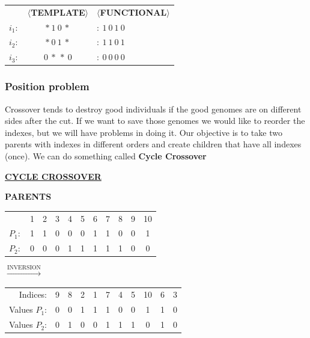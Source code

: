 \vspace{1em}

\begin{center}
    \begin{tabular}{r c l}
        & \textbf{$\langle$TEMPLATE$\rangle$} & \textbf{$\langle$FUNCTIONAL$\rangle$} \\
        $i_1:$ & $* \ 1 \ 0 \ *$ & $: \ 1 \ 0 \ 1 \ 0$ \\
        $i_2:$ & $* \ 0 \ 1 \ *$ & $: \ 1 \ 1 \ 0 \ 1$ \\
        $i_3:$ & $0 \ * \ * \ 0$ & $: \ 0 \ 0 \ 0 \ 0$ \\
    \end{tabular}
\end{center}

\subsubsection{Position problem}

Crossover tends to destroy good individuals if the good genomes are on different sides after the cut. If we want to save those genomes we would like to reorder the indexes, but we will have problems in doing it. Our objective is to take two parents with indexes in different orders and create children that have all indexes (once). We can do something called \textbf{Cycle Crossover}

\begin{center}
    \underline{\Large \textbf{CYCLE CROSSOVER}}
\end{center}

\vspace{1em}

\textbf{PARENTS} \\
\begin{tabular}{r cccccccccc}
    & 1 & 2 & 3 & 4 & 5 & 6 & 7 & 8 & 9 & 10 \\
    $P_1:$ & 1 & 1 & 0 & 0 & 0 & 1 & 1 & 0 & 0 & 1 \\
    $P_2:$ & 0 & 0 & 0 & 1 & 1 & 1 & 1 & 1 & 0 & 0 \\
\end{tabular}

\vspace{1em}
$\xrightarrow{\text{INVERSION}}$
\vspace{1em}

\begin{tabular}{r cccccccccc}
    Indices: & 9 & 8 & 2 & 1 & 7 & 4 & 5 & 10 & 6 & 3 \\
    Values $P_1$: & 0 & 0 & 1 & 1 & 1 & 0 & 0 & 1 & 1 & 0 \\
    Values $P_2$: & 0 & 1 & 0 & 0 & 1 & 1 & 1 & 0 & 1 & 0 \\
\end{tabular}

